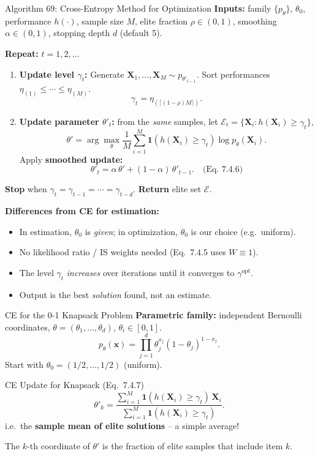 \documentclass[aspectratio=169,10pt]{beamer}
\newcommand{\bx}{\mathbf{x}}
\begin{document}
\begin{frame}[allowframebreaks]{Algorithm 69: Cross-Entropy Method for Optimization}
  \textbf{Inputs:} family $\{p_\theta\}$, $\theta_0$, performance $h(\cdot)$,
  sample size $M$, elite fraction $\rho \in (0,1)$,
  smoothing $\alpha \in (0,1)$, stopping depth $d$ (default 5).

  \medskip
  \textbf{Repeat:} $t = 1, 2, \ldots$
  \begin{enumerate}
    \item \textbf{Update level $\gamma_t$:}
      Generate $\mathbf{X}_1,\ldots,\mathbf{X}_M \sim p_{\theta'_{t-1}}$.
      Sort performances $\eta_{(1)} \le \cdots \le \eta_{(M)}$.
      \[
        \gamma_t = \eta_{(\lceil(1-\rho)M\rceil)}.
      \]
    \item \textbf{Update parameter $\theta'_t$:} from the \emph{same} samples,
      let $\mathcal{E}_t = \{\mathbf{X}_i : h(\mathbf{X}_i) \ge \gamma_t\}$,
      \[
        \theta' = \arg\max_\theta \frac{1}{M} \sum_{i=1}^M \mathbf{1}(h(\mathbf{X}_i)\ge\gamma_t)
        \log p_\theta(\mathbf{X}_i).
      \]
      Apply \textbf{smoothed update:}
      \[
        \theta'_t = \alpha\,\theta' + (1-\alpha)\,\theta'_{t-1}.  \quad\text{(Eq.~7.4.6)}
      \]
  \end{enumerate}
  \textbf{Stop} when $\gamma_t = \gamma_{t-1} = \cdots = \gamma_{t-d}$.
  \textbf{Return} elite set $\mathcal{E}$.

  \framebreak
  \textbf{Differences from CE for estimation:}
  \begin{itemize}
    \item In estimation, $\theta_0$ is \emph{given}; in optimization,
      $\theta_0$ is our choice (e.g.\ uniform).
    \item No likelihood ratio / IS weights needed (Eq.~7.4.5 uses $W\equiv 1$).
    \item The level $\gamma_t$ \emph{increases} over iterations until it
      converges to $\gamma^{\mathrm{opt}}$.
    \item Output is the best \emph{solution} found, not an estimate.
  \end{itemize}
\end{frame}

\begin{frame}{CE for the 0-1 Knapsack Problem}
  \textbf{Parametric family:} independent Bernoulli coordinates,
  $\theta = (\theta_1,\ldots,\theta_d)$, $\theta_i \in [0,1]$.
  \[
    p_\theta(\bx) = \prod_{j=1}^d \theta_j^{x_j}(1-\theta_j)^{1-x_j}.
  \]
  Start with $\theta_0 = (1/2,\ldots,1/2)$ (uniform).

  \begin{block}{CE Update for Knapsack (Eq.~7.4.7)}
    \[
      \theta'_k
      = \frac{\displaystyle\sum_{i=1}^M \mathbf{1}(h(\mathbf{X}_i)\ge\gamma_t)\,\mathbf{X}_i}
             {\displaystyle\sum_{i=1}^M \mathbf{1}(h(\mathbf{X}_i)\ge\gamma_t)}.
    \]
    i.e.\ the \textbf{sample mean of elite solutions} -- a simple average!
  \end{block}

  The $k$-th coordinate of $\theta'$ is the fraction of elite samples
  that include item $k$.
\end{frame}
\end{document}
